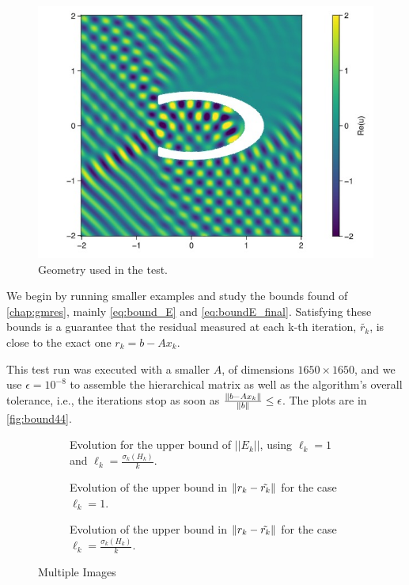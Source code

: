 \begin{figure}[h!]
    \centering
    \includegraphics[width=0.6\linewidth]{images/cavity_fig.jpg}
    \caption{Geometry used in the test.}
    \label{fig:cavity_fig}
\end{figure}


We begin by running smaller examples and study the bounds found of \autoref{chap:gmres}, mainly \ref{eq:bound_E} and \ref{eq:boundE_final}. Satisfying these bounds is a guarantee that the residual measured at each k-th iteration, $\tilde{r_{k}}$, is close to the exact one $r_{k} =b-Ax_{k}$.


This test run was executed with a smaller $A$, of dimensions $1650\times 1650$, and we use $\epsilon = 10^{-8}$ to assemble the hierarchical matrix as well as the algorithm's overall tolerance, i.e., the iterations stop as soon as $\frac{\left\lVert b - Ax_{k}\right\rVert}{\left\lVert b\right\rVert} \leq \epsilon$. The plots are in \autoref{fig:bound44}.

\begin{figure}[h!]
    \centering
    \begin{subfigure}[b]{0.55\linewidth}
        
        \caption{Evolution for the upper bound of $||E_{k}||$, using $\ell_{k}=1$ and $\ell_{k}=\frac{\sigma_{k}(H_{k})}{k}$.}
    \end{subfigure}

    \begin{subfigure}[b]{0.3\linewidth}
        
        \caption{Evolution of the upper bound in $\left\lVert r_{k} - \tilde{r_{k}}\right\rVert$ for the case $\ell_{k}=1$.}
    \end{subfigure}
    \begin{subfigure}[b]{0.3\linewidth}
        
        \caption{Evolution of the upper bound in $\left\lVert r_{k} - \tilde{r_{k}}\right\rVert$ for the case $\ell_{k}=\frac{\sigma_{k}(H_{k})}{k}$.}
    \end{subfigure}
    \caption{Multiple Images}
    \label{fig:bound44}
\end{figure}

